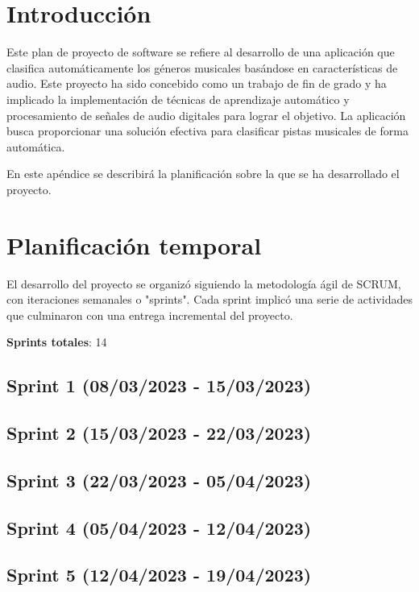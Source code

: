 
\section{Introducción}

Este plan de proyecto de software se refiere al desarrollo de una aplicación que clasifica automáticamente los géneros musicales basándose en características de audio. 
Este proyecto ha sido concebido como un trabajo de fin de grado y ha implicado la implementación de técnicas de aprendizaje automático y procesamiento de señales de audio digitales para lograr el objetivo.
La aplicación busca proporcionar una solución efectiva para clasificar pistas musicales de forma automática.

En este apéndice se describirá la planificación sobre la que se ha desarrollado el proyecto.

\section{Planificación temporal}

El desarrollo del proyecto se organizó siguiendo la metodología ágil de SCRUM, con iteraciones semanales o "sprints". 
Cada sprint implicó una serie de actividades que culminaron con una entrega incremental del proyecto.

\textbf{Sprints totales}: 14

\subsection{Sprint 1 (08/03/2023 - 15/03/2023)}

\subsection{Sprint 2 (15/03/2023 - 22/03/2023)}

\subsection{Sprint 3 (22/03/2023 - 05/04/2023)}

\subsection{Sprint 4 (05/04/2023 - 12/04/2023)}

\subsection{Sprint 5 (12/04/2023 - 19/04/2023)}

